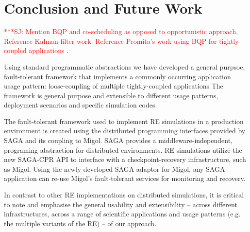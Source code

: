 \documentclass{rspublic}
\newcommand{\alnote}[1]{ {\textcolor{blue} { ***AL: #1 }}}
\newcommand{\jhanote}[1]{ {\textcolor{red} { ***SJ: #1 }}}
\newcommand{\alnote}[1]{}
\newcommand{\jhanote}[1]{}
\begin{document}

\section{Conclusion and Future Work}

\jhanote{Mention BQP and co-scheduling as opposed to opportunistic
  approach. Reference Kalman-filter work. Reference Promita's work
  using BQP for tightly-coupled applications}.

Using standard programmatic abstractions we have developed a general
purpsoe, fault-tolerant framework that implements a commonly occurring
application usage pattern: loose-coupling of multiple tightly-coupled
applications The framework is general purpose and extensible to
different usage patterns, deployment scenarios and specific simulation
codes.

The fault-tolerant framework used to implement RE simulations in a
production environment is created using the distributed programming
interfaces provided by SAGA and its coupling to Migol.  SAGA provides
a middleware-independent, programing abstraction for distributed
environments. RE simulations utilize the new SAGA-CPR API to interface
with a checkpoint-recovery infrastructure, such as Migol. Using the
newly developed SAGA adaptor for Migol, any SAGA application can
re-use Migol's fault-tolerant services for monitoring and recovery.


In contrast to other RE implementations on distributed simulations, it
is critical to note and emphasise the general usability and
extensibility -- across different infrastructures, across a range of
scientific applications and usage patterns (e.g.  the multiple
variants of the RE) -- of our approach.
                  
\end{document}
